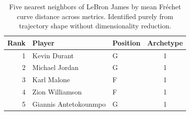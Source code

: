 \begin{table}[htbp]
  \centering\small
  \begin{tabular}{rllc}
    \toprule
    Rank & Player & Position & Archetype \\
    \midrule
    1 & Kevin Durant & G & 1 \\
    2 & Michael Jordan & G & 1 \\
    3 & Karl Malone & F & 1 \\
    4 & Zion Williamson & F & 1 \\
    5 & Giannis Antetokounmpo & G & 1 \\
    \bottomrule
  \end{tabular}
  \caption{Five nearest neighbors of LeBron James by mean Fr\'{e}chet curve distance across metrics. Identified purely from trajectory shape without dimensionality reduction.}
  \label{tab:LeBron_James_frechet_curve_neighbors}
\end{table}

